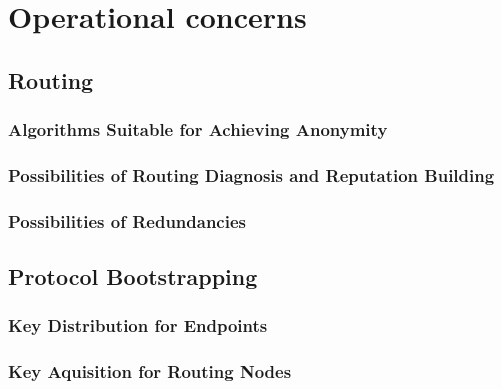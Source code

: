 
\part{Operational concerns}

\chapter{Routing}
\section{Algorithms Suitable for Achieving Anonymity}
\section{Possibilities of Routing Diagnosis and Reputation Building}
\section{Possibilities of Redundancies}

\chapter{Protocol Bootstrapping}
\section{Key Distribution for Endpoints}
\section{Key Aquisition for Routing Nodes}


